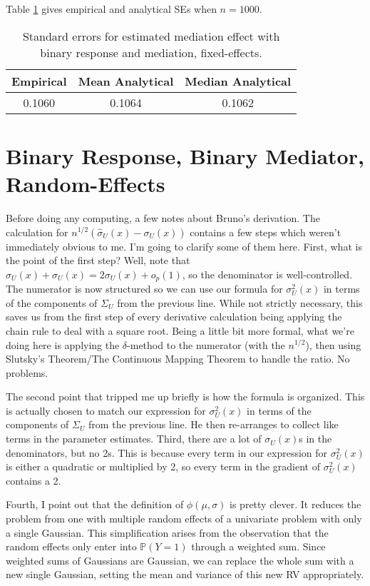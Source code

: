 \documentclass{article}
\newcommand{\bP}{\mathbb{P}}
\begin{document}
Table \ref{tab:SEs_bin_bin_fix} gives empirical and analytical SEs when $n=1000$.

\begin{table}
    \centering
    \begin{tabular}{|c|c|c|}
        \hline
        Empirical & Mean Analytical & Median Analytical\\
        \hline
        0.1060 & 0.1064 & 0.1062\\
        \hline
    \end{tabular}
    \caption{Standard errors for estimated mediation effect with binary response and mediation, fixed-effects.}
    \label{tab:SEs_bin_bin_fix}
\end{table}


\section{Binary Response, Binary Mediator, Random-Effects}

Before doing any computing, a few notes about Bruno's derivation. The calculation for $n^{1/2}(\hat{\sigma}_U(x) - \sigma_U(x))$ contains a few steps which weren't immediately obvious to me. I'm going to clarify some of them here. First, what is the point of the first step? Well, note that $\hat{\sigma}_U(x) + \sigma_U(x) = 2 \sigma_U(x) + o_p(1)$, so the denominator is well-controlled. The numerator is now structured so we can use our formula for $\sigma^2_U(x)$ in terms of the components of $\Sigma_U$ from the previous line. While not strictly necessary, this saves us from the first step of every derivative calculation being applying the chain rule to deal with a square root. Being a little bit more formal, what we're doing here is applying the $\delta$-method to the numerator (with the $n^{1/2}$), then using Slutsky's Theorem/The Continuous Mapping Theorem to handle the ratio. No problems.

The second point that tripped me up briefly is how the formula is organized. This is actually chosen to match our expression for $\sigma_U^2(x)$ in terms of the components of $\Sigma_U$ from the previous line. He then re-arranges to collect like terms in the parameter estimates. Third, there are a lot of $\sigma_U(x)$s in the denominators, but no 2s. This is because every term in our expression for $\sigma_U^2(x)$ is either a quadratic or multiplied by 2, so every term in the gradient of $\sigma_U^2(x)$ contains a 2.

Fourth, I point out that the definition of $\phi(\mu, \sigma)$ is pretty clever. It reduces the problem from one with multiple random effects of a univariate problem with only a single Gaussian. This simplification arises from the observation that the random effects only enter into $\bP(Y=1)$ through a weighted sum. Since weighted sums of Gaussians are Gaussian, we can replace the whole sum with a new single Gaussian, setting the mean and variance of this new RV appropriately.
\end{document}
